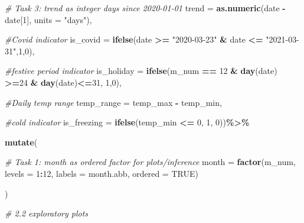 \documentclass[
]{article}
\newenvironment{Shaded}{\begin{snugshade}}{\end{snugshade}}
\newcommand{\AttributeTok}[1]{\textcolor[rgb]{0.13,0.29,0.53}{#1}}
\newcommand{\CommentTok}[1]{\textcolor[rgb]{0.56,0.35,0.01}{\textit{#1}}}
\newcommand{\ConstantTok}[1]{\textcolor[rgb]{0.56,0.35,0.01}{#1}}
\newcommand{\DecValTok}[1]{\textcolor[rgb]{0.00,0.00,0.81}{#1}}
\newcommand{\FunctionTok}[1]{\textcolor[rgb]{0.13,0.29,0.53}{\textbf{#1}}}
\newcommand{\NormalTok}[1]{#1}
\newcommand{\SpecialCharTok}[1]{\textcolor[rgb]{0.81,0.36,0.00}{\textbf{#1}}}
\newcommand{\StringTok}[1]{\textcolor[rgb]{0.31,0.60,0.02}{#1}}
\begin{document}
\begin{Shaded}
\begin{Highlighting}[]
    \CommentTok{\# Task 3: trend as integer days since 2020{-}01{-}01}
    \AttributeTok{trend =} \FunctionTok{as.numeric}\NormalTok{(date }\SpecialCharTok{{-}}\NormalTok{ date[}\DecValTok{1}\NormalTok{], }\AttributeTok{units =} \StringTok{"days"}\NormalTok{),}
    
    \CommentTok{\#Covid indicator}
    \AttributeTok{is\_covid =} \FunctionTok{ifelse}\NormalTok{(date }\SpecialCharTok{\textgreater{}=} \StringTok{"2020{-}03{-}23"} \SpecialCharTok{\&}\NormalTok{ date }\SpecialCharTok{\textless{}=} \StringTok{"2021{-}03{-}31"}\NormalTok{,}\DecValTok{1}\NormalTok{,}\DecValTok{0}\NormalTok{),}
    
    \CommentTok{\#festive period indicator}
    \AttributeTok{is\_holiday =} \FunctionTok{ifelse}\NormalTok{(m\_num }\SpecialCharTok{==} \DecValTok{12} \SpecialCharTok{\&} \FunctionTok{day}\NormalTok{(date) }\SpecialCharTok{\textgreater{}=}\DecValTok{24} \SpecialCharTok{\&} \FunctionTok{day}\NormalTok{(date)}\SpecialCharTok{\textless{}=}\DecValTok{31}\NormalTok{, }\DecValTok{1}\NormalTok{,}\DecValTok{0}\NormalTok{),}
    
    \CommentTok{\#Daily temp range}
    \AttributeTok{temp\_range =}\NormalTok{ temp\_max }\SpecialCharTok{{-}}\NormalTok{ temp\_min,}
    
    \CommentTok{\#cold indicator}
    \AttributeTok{is\_freezing =} \FunctionTok{ifelse}\NormalTok{(temp\_min }\SpecialCharTok{\textless{}=} \DecValTok{0}\NormalTok{, }\DecValTok{1}\NormalTok{, }\DecValTok{0}\NormalTok{))}\SpecialCharTok{\%\textgreater{}\%}
  
  \FunctionTok{mutate}\NormalTok{(}
    
    \CommentTok{\# Task 1: month as ordered factor for plots/inference}
    \AttributeTok{month =} \FunctionTok{factor}\NormalTok{(m\_num,}
                    \AttributeTok{levels =} \DecValTok{1}\SpecialCharTok{:}\DecValTok{12}\NormalTok{,    }
                    \AttributeTok{labels =}\NormalTok{ month.abb, }
                    \AttributeTok{ordered =} \ConstantTok{TRUE}\NormalTok{)}
    
\NormalTok{    )}

\CommentTok{\# 2.2 exploratory plots}


\end{Highlighting}
\end{Shaded}
\end{document}
